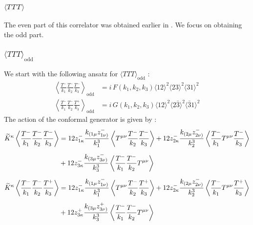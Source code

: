 \documentclass[a4paper,11pt]{article}
\begin{document}


\subsection{$\ev{TTT}$}
\label{CWItttapp}
The even part of this correlator was obtained earlier in \cite{Baumann:2020dch, Bzowski:2013sza}. We focus on obtaining the odd part. 
\subsubsection*{$\langle TTT \rangle_{\text{odd}}$}
We start with the following ansatz for $\langle TTT \rangle_{\text{odd}}$ : 
\begin{align}
\left\langle \frac{T^-}{k_1}\frac{T^-}{k_2} \frac{T^-}{k_3} \right\rangle_{\text{odd}} &=i\,F(k_1,k _2, k_3)\langle 12 \rangle^2 \langle 23 \rangle^2 \langle 31 \rangle^2\\[6 pt]
\left\langle \frac{T^-}{k_1} \frac{T^-}{k_2} \frac{T^+}{k_3} \right\rangle_{\text{odd}} &=i\,G(k_1,k _2, k_3)\langle 12 \rangle^2 \langle 2\bar{3} \rangle^2 \langle \bar{3}1 \rangle^2
\end{align}
The action of the conformal generator is given by :
\begin{align}\label{Kkappattt}
\widetilde{K}^{\kappa}\left\langle \frac{T^-}{k_1}\frac{T^-}{k_2}\frac{T^-}{k_3} \right\rangle &= 12 z^-_{1\kappa} \frac{k_{(1\mu}z_{1\nu)}^-}{k_1^3}\left\langle T^{\mu\nu} \frac{T^-}{k_2} \frac{T^-}{k_3} \right\rangle+12 z^-_{2\kappa} \frac{k_{(2\mu}z_{2\nu)}^-}{k_2^3}\left\langle \frac{T^-}{k_1} T^{\mu\nu} \frac{T^-}{k_3} \right\rangle\notag\\[5 pt]
&+12 z^-_{3\kappa} \frac{k_{(3\mu}z_{3\nu)}^-}{k_3^3}\left\langle \frac{T^-}{k_1} \frac{T^-}{k_2} T^{\mu\nu} \right\rangle \notag\\[5 pt]
\widetilde{K}^{\kappa}\left\langle \frac{T^-}{k_1}\frac{T^-}{k_2}\frac{T^+}{k_3} \right\rangle &= 12 z^-_{1\kappa} \frac{k_{(1\mu}z_{1\nu)}^-}{k_1^3}\left\langle T^{\mu\nu} \frac{T^-}{k_2} \frac{T^+}{k_3} \right\rangle+12 z^-_{2\kappa} \frac{k_{(2\mu}z_{2\nu)}^-}{k_2^3}\left\langle \frac{T^-}{k_1} T^{\mu\nu} \frac{T^+}{k_3} \right\rangle\notag\\[5 pt]
&+12 z^+_{3\kappa} \frac{k_{(3\mu}z_{3\nu)}^+}{k_3^3}\left\langle \frac{T^-}{k_1} \frac{T^-}{k_2} T^{\mu\nu} \right\rangle
\end{align}
\end{document}
